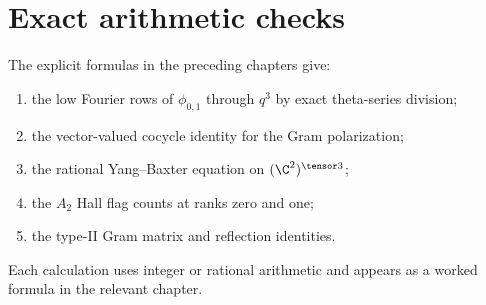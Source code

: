 \chapter{Exact arithmetic checks}
The explicit formulas in the preceding chapters give:
\begin{enumerate}
\item the low Fourier rows of $\phi_{0,1}$ through $q^3$ by exact theta-series division;
\item the vector-valued cocycle identity for the Gram polarization;
\item the rational Yang--Baxter equation on $(\C^2)^{\tensor3}$;
\item the $A_2$ Hall flag counts at ranks zero and one;
\item the type-II Gram matrix and reflection identities.
\end{enumerate}
Each calculation uses integer or rational arithmetic and appears as a worked formula in the relevant chapter.
